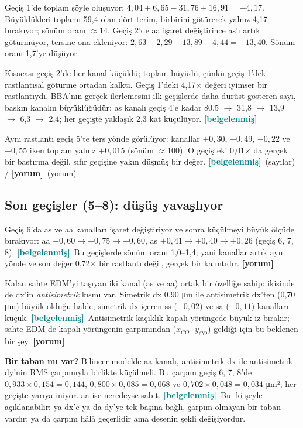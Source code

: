 \documentclass[11pt,a4paper]{article}
\newcommand{\bel}{\textcolor{teal}{\textbf{\footnotesize [belgelenmiş]}}}
\newcommand{\yor}{\textcolor{orange!80!black}{\textbf{\footnotesize [yorum]}}}
\begin{document}
Geçiş 1'de toplam şöyle oluşuyor: $4{,}04 + 6{,}65 - 31{,}76 + 16{,}91 = -4{,}17$. Büyüklükleri
toplamı 59{,}4 olan dört terim, birbirini götürerek yalnız 4{,}17 bırakıyor; sönüm oranı $\approx$14.
Geçiş 2'de aa işaret değiştirince as'ı artık götürmüyor, tersine ona ekleniyor:
$2{,}63 + 2{,}29 - 13{,}89 - 4{,}44 = -13{,}40$. Sönüm oranı 1{,}7'ye düşüyor.

Kısacası geçiş 2'de her kanal küçüldü; toplam büyüdü, çünkü geçiş 1'deki rastlantısal götürme
ortadan kalktı. Geçiş 1'deki 4{,}17$\times$ değeri iyimser bir rastlantıydı. BBA'nın
gerçek ilerlemesini ilk geçişlerde daha dürüst gösteren sayı, baskın kanalın büyüklüğüdür:
as kanalı geçiş 4'e kadar 80{,}5 $\to$ 31{,}8 $\to$ 13{,}9 $\to$ 6{,}3 $\to$ 2{,}4; her geçişte
yaklaşık 2{,}3 kat küçülüyor. \bel

Aynı rastlantı geçiş 5'te ters yönde görülüyor: kanallar $+0{,}30$, $+0{,}49$, $-0{,}22$ ve
$-0{,}55$ iken toplam yalnız $+0{,}015$ (sönüm $\approx$100). O geçişteki 0{,}01$\times$ da gerçek bir
bastırma değil, sıfır geçişine yakın düşmüş bir değer. \bel\ (sayılar) / \yor\ (yorum)

\subsection*{Son geçişler (5--8): düşüş yavaşlıyor}
Geçiş 6'da as ve aa kanalları işaret değiştiriyor ve sonra küçülmeyi büyük ölçüde bırakıyor:
aa $+0{,}60 \to +0{,}75 \to +0{,}60$, as $+0{,}41 \to +0{,}40 \to +0{,}26$ (geçiş 6, 7, 8). \bel\
Bu geçişlerde sönüm oranı 1{,}0--1{,}4; yani kanallar artık aynı yönde ve son değer
0{,}72$\times$ bir rastlantı değil, gerçek bir kalıntıdır. \yor

Kalan sahte EDM'yi taşıyan iki kanal (as ve aa) ortak bir özelliğe sahip: ikisinde de dx'in
\emph{antisimetrik} kısmı var. Simetrik dx 0{,}90 μm ile antisimetrik dx'ten (0{,}70 μm) büyük
olduğu halde, simetrik dx içeren ss ($-0{,}02$) ve sa ($-0{,}11$) kanalları küçük. \bel\
Antisimetrik kaçıklık kapalı yörüngede büyük iz bırakır; sahte EDM de kapalı yörüngenin
çarpımından ($x_{CO}\cdot y_{CO}$) geldiği için bu beklenen bir şey. \yor

\textbf{Bir taban mı var?} Bilineer modelde aa kanalı, antisimetrik dx ile antisimetrik dy'nin
RMS çarpımıyla birlikte küçülmeli. Bu çarpım geçiş 6, 7, 8'de $0{,}933 \times 0{,}154 = 0{,}144$,
$0{,}800 \times 0{,}085 = 0{,}068$ ve $0{,}702 \times 0{,}048 = 0{,}034$ μm²; her geçişte yarıya
iniyor. aa ise neredeyse sabit. \bel\ Bu iki şeyle açıklanabilir: ya dx'e ya da dy'ye tek başına
bağlı, çarpım olmayan bir taban vardır; ya da çarpım hâlâ geçerlidir ama desenin şekli değişiyordur.
\end{document}
